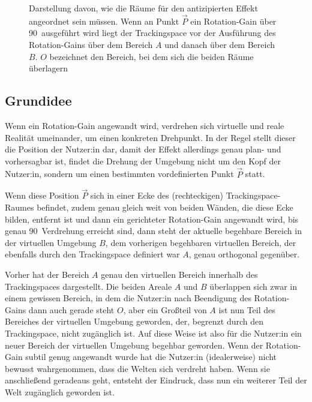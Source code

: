 \begin{figure}[H]
    \caption{Darstellung davon, wie die Räume für den antizipierten Effekt angeordnet sein müssen. Wenn an Punkt $\vec{P}$ ein Rotation-Gain über 90\textdegree\ ausgeführt wird liegt der Trackingspace vor der Ausführung des Rotation-Gains über dem Bereich $A$ und danach über dem Bereich $B$. $O$ bezeichnet den Bereich, bei dem sich die beiden Räume überlagern}\label{figure:two_rooms}
\end{figure}

\subsection{Grundidee}
\label{subsec:roomplaceidea}
Wenn ein Rotation-Gain angewandt wird, verdrehen sich virtuelle und reale Realität umeinander, um einen konkreten Drehpunkt. In der Regel stellt dieser die Position der Nutzer:in dar, damit der Effekt allerdings genau plan- und vorhersagbar ist, findet die Drehung der Umgebung nicht um den Kopf der Nutzer:in, sondern um einen bestimmten vordefinierten Punkt $\vec{P}$ statt.

Wenn diese Position $\vec{P}$ sich in einer Ecke des (rechteckigen) Trackingspace-Raumes befindet, zudem genau gleich weit von beiden Wänden, die diese Ecke bilden, entfernt ist und dann ein gerichteter Rotation-Gain angewandt wird,
bis genau 90\textdegree\ Verdrehung erreicht sind, dann steht der aktuelle begehbare Bereich in der virtuellen Umgebung $B$, dem vorherigen begehbaren virtuellen Bereich, der ebenfalls durch den Trackingspace definiert war $A$, genau orthogonal gegenüber.

Vorher hat der Bereich $A$ genau den virtuellen Bereich innerhalb des Trackingspaces dargestellt. Die beiden Areale $A$ und $B$ überlappen sich zwar in einem gewissen Bereich, in dem die Nutzer:in nach Beendigung des Rotation-Gains dann auch gerade steht $O$, aber ein Großteil von $A$ ist nun Teil des Bereiches der virtuellen Umgebung geworden, der, begrenzt durch den Trackingspace, nicht zugänglich ist. Auf diese Weise ist also für die Nutzer:in ein neuer Bereich der virtuellen Umgebung begehbar geworden.
Wenn der Rotation-Gain subtil genug angewandt wurde hat die Nutzer:in (idealerweise) nicht bewusst wahrgenommen, dass die Welten sich verdreht haben. Wenn sie anschließend geradeaus geht, entsteht der Eindruck, dass nun ein weiterer Teil der Welt zugänglich geworden ist.

